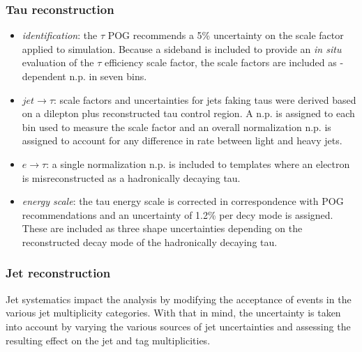 \subsubsection{Tau reconstruction}
    \begin{itemize}
        \item \textit{identification}: the $\tau$ POG recommends a 5\%
            uncertainty on the scale factor applied to simulation.
            Because a sideband is included to provide an \emph{in situ}
            evaluation of the $\tau$ efficiency scale factor, the scale
            factors are included as \pt-dependent n.p. in seven \pt
            bins.
        \item \textit{$jet\rightarrow\tau$}: scale factors and
            uncertainties for jets faking taus were derived based on a
            dilepton plus reconstructed tau control region.  A n.p. is
            assigned to each \pt bin used to measure the scale factor
            and an overall normalization n.p. is assigned to account for
            any difference in rate between light and heavy jets.
        \item \textit{$e\rightarrow\tau$}: a single normalization n.p.
            is included to templates where an electron is
            misreconstructed as a hadronically decaying tau.
        \item \textit{energy scale}: the tau energy scale is corrected in
            correspondence with POG recommendations and an uncertainty
            of 1.2\% per decy mode is assigned.  These are included as
            three shape uncertainties depending on the reconstructed
            decay mode of the hadronically decaying tau.
    \end{itemize}

\subsubsection{Jet reconstruction}

    Jet systematics impact the analysis by modifying the acceptance of
    events in the various jet multiplicity categories.  With that in
    mind, the uncertainty is taken into account by varying the various
    sources of jet uncertainties and assessing the resulting effect on
    the jet and \PQb tag multiplicities.

